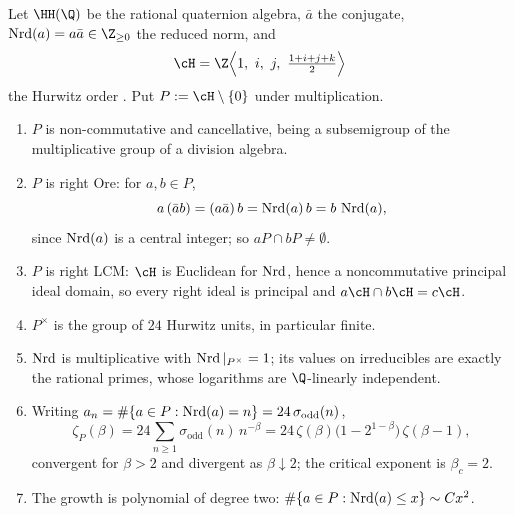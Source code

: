 Let $\HH(\Q)$ be the rational quaternion algebra, $\bar a$ the conjugate,
$\Nrd(a)=a\bar a\in\Z_{\ge0}$ the reduced norm, and
\[
\cH=\Z\Bigl\langle 1,\ i,\ j,\ \tfrac{1+i+j+k}{2}\Bigr\rangle
\]
the Hurwitz order \cite{Hurwitz,Reiner}. Put $P:=\cH\setminus\{0\}$ under multiplication.

\begin{theorem}\label{X:thm:hurwitz}
\begin{enumerate}
\item $P$ is non-commutative and cancellative, being a subsemigroup of the multiplicative
group of a division algebra.
\item $P$ is right Ore: for $a,b\in P$,
\[
a\,(\bar ab)=(a\bar a)\,b=\operatorname{Nrd}(a)\,b=b\,\operatorname{Nrd}(a),
\]
since $\operatorname{Nrd}(a)$ is a central integer; so $aP\cap bP\ne\emptyset$.
\item $P$ is right LCM: $\cH$ is Euclidean for $\operatorname{Nrd}$, hence a noncommutative principal ideal
domain, so every right ideal is principal and $a\cH\cap b\cH=c\cH$.
\item $P^\times$ is the group of $24$ Hurwitz units, in particular finite.
\item $\operatorname{Nrd}$ is multiplicative with $\operatorname{Nrd}|_{P^\times}=1$; its values on irreducibles are
exactly the rational primes, whose logarithms are $\Q$-linearly independent.
\item Writing $a_n=\#\{a\in P:\operatorname{Nrd}(a)=n\}=24\,\sigma_{\mathrm{odd}}(n)$,
\begin{equation}\label{X:eq:zeta}
\zeta_P(\beta)=24\sum_{n\ge1}\sigma_{\mathrm{odd}}(n)\,n^{-\beta}
=24\,\zeta(\beta)\bigl(1-2^{1-\beta}\bigr)\,\zeta(\beta-1),
\end{equation}
convergent for $\beta>2$ and divergent as $\beta\downarrow2$; the critical exponent is
$\beta_c=2$.
\item The growth is polynomial of degree two: $\#\{a\in P:\operatorname{Nrd}(a)\le x\}\sim Cx^2$.
\end{enumerate}
\end{theorem}

